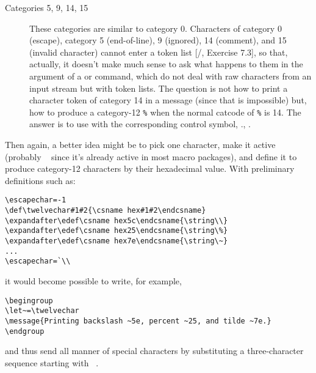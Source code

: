 {\begin{description}
\item[Categories 5, 9, 14, 15] These categories are similar to category
0. Characters of category 0 (escape), category 5 (end-of-line), 9
(ignored), 14 (comment), and 15 (invalid character) cannot enter a
token list [\texbook/, Exercise 7.3], so that, actually, it doesn't make much
sense to ask what happens to them in the argument of a   or
 command, which do not deal with raw characters from an input
stream but with token lists. The  question is not how to print a
character token of category 14 in a message (since that is impossible)
but, how to produce a category-12 \verb;%; when the normal catcode of
\verb;%; is 14. The answer is to
use  with the corresponding control symbol, \eg.,
.

\end{description}

Then again, a better idea might be to pick one character, make it
active (probably {\tt\string ~} since it's already active in most
macro packages), and define it to produce category-12
characters by their hexadecimal value. With preliminary
definitions such as:
\begin{verbatim}
\escapechar=-1
\def\twelvechar#1#2{\csname hex#1#2\endcsname}
\expandafter\edef\csname hex5c\endcsname{\string\\}
\expandafter\edef\csname hex25\endcsname{\string\%}
\expandafter\edef\csname hex7e\endcsname{\string\~}
...
\escapechar=`\\
\end{verbatim}
it would become possible to write, for example,
\begin{verbatim}
\begingroup
\let~=\twelvechar
\message{Printing backslash ~5e, percent ~25, and tilde ~7e.}
\endgroup
\end{verbatim}
and thus send all manner of special characters by substituting a
three-character sequence starting with {\tt\string~}.

}
